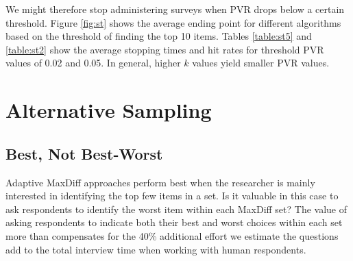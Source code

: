 \documentclass[a4paper,11pt]{article}
\begin{document}
We might therefore stop administering surveys when PVR drops below a certain threshold. Figure \ref{fig:st} shows the average ending point for different algorithms based on the threshold of finding the top 10 items. Tables \ref{table:st5} and \ref{table:st2} show the average stopping times and hit rates for threshold PVR values of 0.02 and 0.05. In general, higher $k$ values yield smaller PVR values.


\section{Alternative Sampling}


\subsection{Best, Not Best-Worst}

Adaptive MaxDiff approaches perform best when the researcher is mainly interested in identifying the top few items in a set. Is it valuable in this case to ask respondents to identify the worst item within each MaxDiff set? The value of asking respondents to indicate both their best and worst choices within each set more than compensates for the 40\% additional effort we estimate the questions add to the total interview time when working with human respondents.
\end{document}

